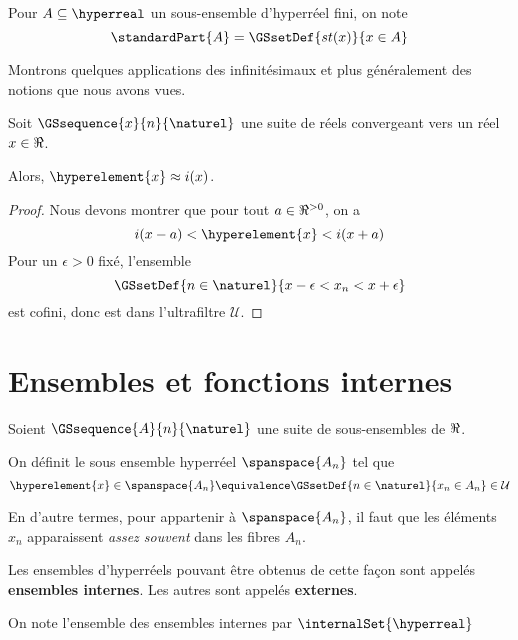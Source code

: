 \documentclass[a4paper, 12pt]{report}
\begin{document}
\begin{notation}
	Pour $A \subseteq \hyperreal$ un sous-ensemble d'hyperréel fini, on note
	\begin{equation}
		\standardPart{A} = \GSsetDef{st(x)}{x \in A}
	\end{equation}
\end{notation}

Montrons quelques applications des infinitésimaux et plus généralement des
notions que nous avons vues.

\begin{proposition}
	Soit $\GSsequence{x}{n}{\naturel}$ une suite de réels convergeant vers un
	réel $x \in \real$.

	Alors, $\hyperelement{x} \approx i(x)$.
\end{proposition}

\ifdefined\outputproof
\begin{proof}
	Nous devons montrer que pour tout $a \in \real^{> 0}$, on a
	\begin{equation}
		i(x - a) < \hyperelement{x} < i(x + a)
	\end{equation}
	Pour un $\epsilon > 0$ fixé, l'ensemble
	\begin{equation}
		\GSsetDef{n \in \naturel}{x - \epsilon < x_{n} < x + \epsilon}
	\end{equation}
	est cofini, donc est dans l'ultrafiltre $\mathcal{U}$.
\end{proof}
\fi

\section{Ensembles et fonctions internes}

\begin{definition} 
	Soient $\GSsequence{A}{n}{\naturel}$ une suite de sous-ensembles de $\real$.

	On définit le sous ensemble hyperréel $\spanspace{A_{n}}$
	tel que
	\begin{equation}
		\hyperelement{x} \in \spanspace{A_{n}} \equivalence \GSsetDef{n \in
		\naturel}{x_{n} \in A_{n}} \in \mathcal{U}
	\end{equation}

	En d'autre termes, pour appartenir à $\spanspace{A_{n}}$, il faut que les
	éléments $x_{n}$ apparaissent \textit{assez souvent} dans les fibres $A_{n}$.

	Les ensembles d'hyperréels pouvant être obtenus de cette façon sont appelés
	\textbf{ensembles internes}. Les autres sont appelés \textbf{externes}.

	On note l'ensemble des ensembles internes par $\internalSet{\hyperreal}$

\end{definition}
\end{document}
